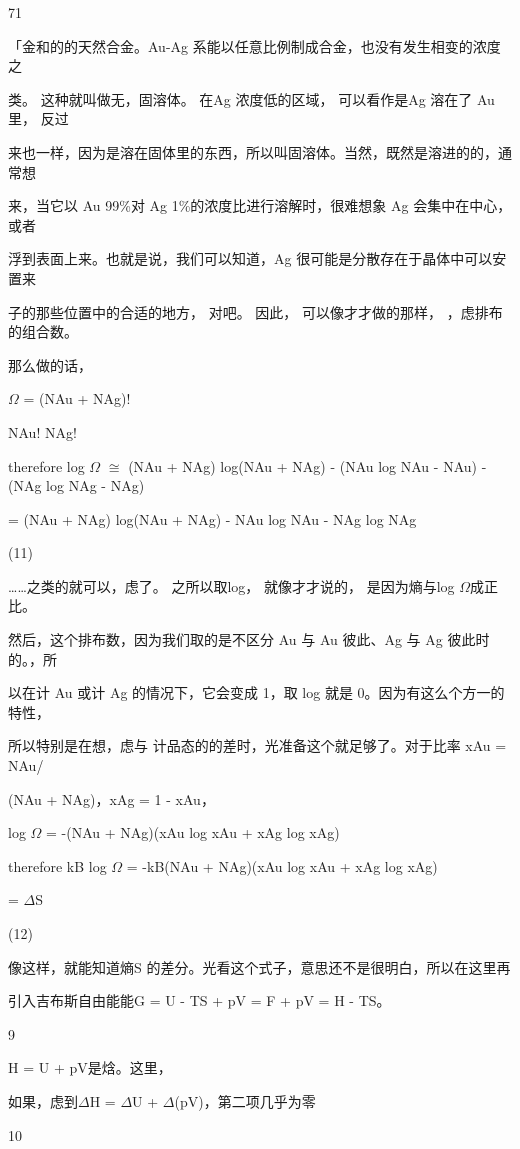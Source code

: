71\par
「金和的的天然合金。Au-Ag 系能以任意比例制成合金，也没有发生相变的浓度之\par
类。 这种就叫做无，固溶体。 在Ag 浓度低的区域， 可以看作是Ag 溶在了 Au 里， 反过\par
来也一样，因为是溶在固体里的东西，所以叫固溶体。当然，既然是溶进的的，通常想\par
来，当它以 Au 99\%对 Ag 1\%的浓度比进行溶解时，很难想象 Ag 会集中在中心，或者\par
浮到表面上来。也就是说，我们可以知道，Ag 很可能是分散存在于晶体中可以安置来\par
子的那些位置中的合适的地方， 对吧。 因此， 可以像才才做的那样， ，虑排布的组合数。\par
那么做的话，\par
$\Omega$ = (NAu + NAg)!\par
NAu! NAg!\par
therefore log $\Omega$ $\cong$ (NAu + NAg) log(NAu + NAg) - (NAu log NAu - NAu) - (NAg log NAg - NAg)\par
= (NAu + NAg) log(NAu + NAg) - NAu log NAu - NAg log NAg\par
(11)\par
……之类的就可以，虑了。 之所以取log， 就像才才说的， 是因为熵与log $\Omega$成正比。\par
然后，这个排布数，因为我们取的是不区分 Au 与 Au 彼此、Ag 与 Ag 彼此时的。，所\par
以在计 Au 或计 Ag 的情况下，它会变成 1，取 log 就是 0。因为有这么个方一的特性，\par
所以特别是在想，虑与 计品态的的差时，光准备这个就足够了。对于比率 xAu = NAu/\par
(NAu + NAg)，xAg = 1 - xAu，\par
log $\Omega$ = -(NAu + NAg)(xAu log xAu + xAg log xAg)\par
therefore kB log $\Omega$ = -kB(NAu + NAg)(xAu log xAu + xAg log xAg)\par
= $\Delta$S\par
(12)\par
像这样，就能知道熵S 的差分。光看这个式子，意思还不是很明白，所以在这里再\par
引入吉布斯自由能能G = U - TS + pV = F + pV = H - TS。\par
9\par
H = U + pV是焓。这里，\par
如果，虑到$\Delta$H = $\Delta$U + $\Delta$(pV)，第二项几乎为零\par
10\par
